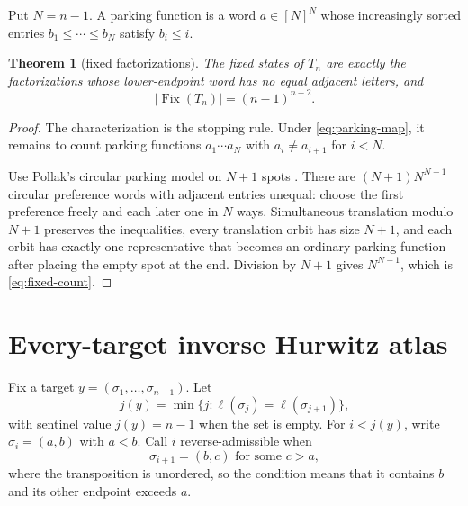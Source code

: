 \documentclass[a4paper,10pt]{amsart}
\newtheorem{theorem}{Theorem}[section]
\theoremstyle{remark}
\begin{document}
Put $N=n-1$.  A parking function is a word $a\in[N]^N$ whose increasingly
sorted entries $b_1\le\cdots\le b_N$ satisfy $b_i\le i$.

\begin{theorem}[fixed factorizations]\label{thm:fixed}
The fixed states of $T_n$ are exactly the factorizations whose lower-endpoint
word has no equal adjacent letters, and
\begin{equation}\label{eq:fixed-count}
                  |\operatorname{Fix}(T_n)|=(n-1)^{n-2}.
\end{equation}
\end{theorem}

\begin{proof}
The characterization is the stopping rule.  Under
\eqref{eq:parking-map}, it remains to count parking functions
$a_1\cdots a_N$ with $a_i\ne a_{i+1}$ for $i<N$.

Use Pollak's circular parking model on $N+1$ spots
\cite{Stanley2011EC2}.  There are $(N+1)N^{N-1}$ circular preference words
with adjacent entries unequal: choose the first preference freely and each
later one in $N$ ways.  Simultaneous translation modulo $N+1$ preserves the
inequalities, every translation orbit has size $N+1$, and each orbit has
exactly one representative that becomes an ordinary parking function after
placing the empty spot at the end.  Division by $N+1$ gives $N^{N-1}$,
which is \eqref{eq:fixed-count}.
\end{proof}

\section{Every-target inverse Hurwitz atlas}

Fix a target $y=(\sigma_1,\ldots,\sigma_{n-1})$.  Let
\begin{equation}\label{eq:first-target-collision}
 j(y)=\min\{j:\ell(\sigma_j)=\ell(\sigma_{j+1})\},
\end{equation}
with sentinel value $j(y)=n-1$ when the set is empty.  For $i<j(y)$, write
$\sigma_i=(a,b)$ with $a<b$.  Call $i$ reverse-admissible when
\begin{equation}\label{eq:admissible}
 \sigma_{i+1}=(b,c)\text{ for some }c>a,
\end{equation}
where the transposition is unordered, so the condition means that it contains
$b$ and its other endpoint exceeds $a$.
\end{document}
